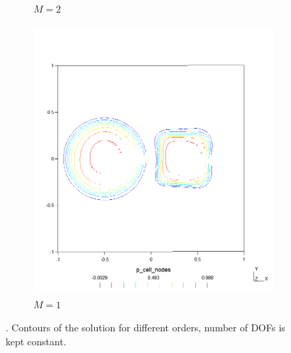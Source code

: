 \begin{figure}[p!]
\begin{subfigure}{.5\textwidth}
        \caption{$M=2$}
    \end{subfigure}%
    \begin{subfigure}{.5\textwidth}
        \centering	
        \includegraphics[width=\linewidth]{../figs/sols/kriv-sol-h14400o01}
        \caption{$M = 1$}
    \end{subfigure}
    \caption{. Contours of the solution for different orders, number 
    of DOFs is kept constant.}
    \label{fig:sol_cont_adv2D}
\end{figure}


